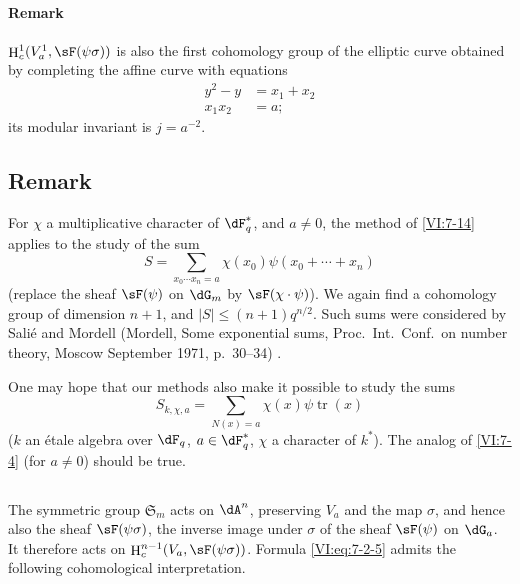 \documentclass[oneside]{book}
\DeclareMathOperator{\h}{H}
\DeclareMathOperator{\tr}{tr}
\newcounter{char}
\theoremstyle{sga-source}
\theoremstyle{sga-source-dash}
\theoremstyle{sga-source-dotdash}
\theoremstyle{sga-source-number-note-dash}
\theoremstyle{sga-source-note-number-dotdash}
\theoremstyle{sga-source-example-dotdash}
\theoremstyle{sga-source-inline-number}
\theoremstyle{sga-source-bare-number}
\theoremstyle{sga-source}
\newcommand{\PrintPage}[1]{}\newcommand{\MathPage}[1]{}\newcommand{\PrintCite}[2]{#1}\newcommand{\var}[3]{#1}
\begin{document}
\paragraph{Remark}

$\h_c^1(V_a^1,\sF(\psi\sigma))$ is also the first cohomology group of 
the elliptic curve obtained by completing the affine curve with equations 
\begin{align*}
  y^2-y &= x_1+x_2 \\
  x_1 x_2 &= a \text{;} 
\end{align*}
its modular invariant is $j=a^{-2}$. 





\PrintPage{228}
\subsection{Remark}\label{VI:7-18}

For $\chi$ a multiplicative character of $\dF_q^\ast$, and $a\ne 0$, the 
method of \ref{VI:7-14} applies to the study of the sum 
\[
  S = \sum_{x_0\dotsm x_n = a} \chi(x_0) \psi(x_0+\cdots + x_n) 
\]
(replace the sheaf $\sF(\psi)$ on $\dG_m$ by $\sF(\chi\cdot \psi)$). We 
again find a cohomology group of dimension $n+1$, and 
$|S|\leqslant (n+1)q^{n/2}$. Such sums were considered by 
Salié and Mordell (Mordell, Some exponential sums, Proc.~Int.~Conf.~on number theory, Moscow September 1971, p.~30--34) \cite{mo73}.

One may hope that our methods also make it possible to study the sums 
\[
  S_{k,\chi,a} = \sum_{N(x)=a} \chi(x) \psi \tr(x) 
\]
($k$ an étale algebra over $\dF_q$, $a\in \dF_q^\ast$, $\chi$ a character of 
$k^\ast$). The analog of \ref{VI:7-4} (for $a\ne 0$) should be true. 





\subsection{}\label{VI:7-19}

\var{The symmetric group $\mathfrak{S}_m$}{The symmetric group $\mathfrak{S}_n$}{S45-SOL-0966} acts on $\dA^n$, preserving $V_a$ and 
the map $\sigma$, and hence also the sheaf $\sF(\psi\sigma)$, the inverse 
image under $\sigma$ of the sheaf $\sF(\psi)$ on $\dG_a$. It therefore acts 
on $\h_c^{n-1}(V_a,\sF(\psi\sigma))$. Formula \eqref{VI:eq:7-2-5} admits 
the following cohomological interpretation.
\end{document}
